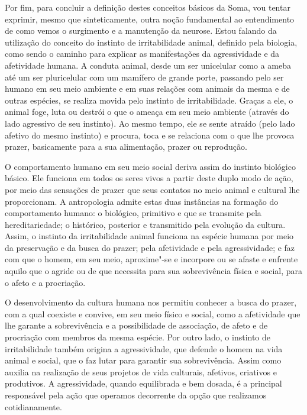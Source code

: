 Por fim, para concluir a definição destes conceitos básicos da Soma, vou
tentar exprimir, mesmo que sinteticamente, outra noção fundamental ao
entendimento de como vemos o surgimento e a manutenção da neurose. Estou
falando da utilização do conceito do instinto de irritabilidade animal,
definido pela biologia, como sendo o caminho para explicar as
manifestações da agressividade e da afetividade humana. A conduta
animal, desde um ser unicelular como a ameba até um ser pluricelular com
um mamífero de grande porte, passando pelo ser humano em seu meio
ambiente e em suas relações com animais da mesma e de outras espécies,
se realiza movida pelo instinto de irritabilidade. Graças a ele, o
animal foge, luta ou destrói o que o ameaça em seu meio ambiente
(através do lado agressivo de seu instinto). Ao mesmo tempo, ele se
sente atraído (pelo lado afetivo do mesmo instinto) e procura, toca e se
relaciona com o que lhe provoca prazer, basicamente para a sua
alimentação, prazer ou reprodução.

O comportamento humano em seu meio social deriva assim do instinto
biológico básico. Ele funciona em todos os seres vivos a partir deste
duplo modo de ação, por meio das sensações de prazer que seus contatos
no meio animal e cultural lhe proporcionam. A antropologia admite estas
duas instâncias na formação do comportamento humano: o biológico,
primitivo e que se transmite pela hereditariedade; o histórico,
posterior e transmitido pela evolução da cultura. Assim, o instinto da
irritabilidade animal funciona na espécie humana por meio da preservação
e da busca do prazer; pela afetividade e pela agressividade; e faz com
que o homem, em seu meio, aproxime"-se e incorpore ou se afaste e
enfrente aquilo que o agride ou de que necessita para sua sobrevivência
física e social, para o afeto e a procriação.

O desenvolvimento da cultura humana nos permitiu conhecer a busca do
prazer, com a qual coexiste e convive, em seu meio físico e social, como
a afetividade que lhe garante a sobrevivência e a possibilidade de
associação, de afeto e de procriação com membros da mesma espécie. Por
outro lado, o instinto de irritabilidade também origina a agressividade,
que defende o homem na vida animal e social, que o faz lutar para
garantir sua sobrevivência. Assim como auxilia na realização de seus
projetos de vida culturais, afetivos, criativos e produtivos. A
agressividade, quando equilibrada e bem dosada, é a principal
responsável pela ação que operamos decorrente da opção que realizamos
cotidianamente.

